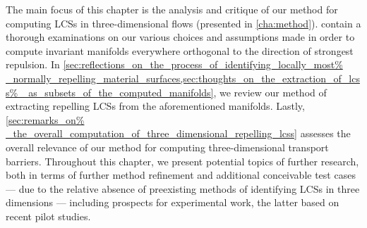 The main focus of this chapter is the analysis and critique of our method for
computing LCSs in three-dimensional flows (presented in \cref{cha:method}).
 contain a thorough
examinations on our various choices and assumptions made in order to compute
invariant manifolds everywhere orthogonal to the direction of strongest
repulsion. In \cref{sec:reflections_on_the_process_of_identifying_locally_most%
_normally_repelling_material_surfaces,sec:thoughts_on_the_extraction_of_lcss%
_as_subsets_of_the_computed_manifolds}, we review our method of extracting
repelling LCSs from the aforementioned manifolds. Lastly, \cref{sec:remarks_on%
_the_overall_computation_of_three_dimensional_repelling_lcss} assesses
the overall relevance of our method for computing three-dimensional transport
barriers. Throughout this chapter, we present potential topics of further
research, both in terms of further method refinement and additional conceivable
test cases --- due to the relative absence of preexisting methods of
identifying LCSs in three dimensions --- including prospects for experimental
work, the latter based on recent pilot studies.
